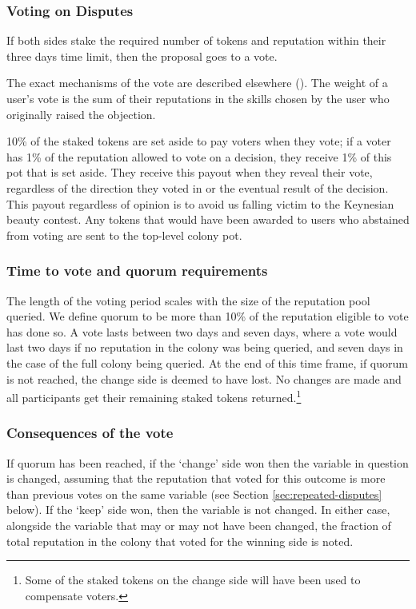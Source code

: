 \subsubsection{Voting on Disputes}
If both sides stake the required number of tokens and reputation within their three days time limit, then the proposal goes to a vote.

The exact mechanisms of the vote are described elsewhere (\cite{ColonyVoting}). The weight of a user's vote is the sum of their reputations in the skills chosen by the user who originally raised the objection.


10\% of the staked tokens are set aside to pay voters when they vote; if a voter has 1\% of the reputation allowed to vote on a decision, they receive 1\% of this pot that is set aside. They receive this payout when they reveal their vote, regardless of the direction they voted in or the eventual result of the decision. This payout regardless of opinion is to avoid us falling victim to the Keynesian beauty contest\cite{KeynesianBeauty}. Any tokens that would have been awarded to users who abstained from voting are sent to the top-level colony pot.


\subsubsection{Time to vote and quorum requirements}
The length of the voting period scales with the size of the reputation pool queried. We define quorum to be more than 10\% of the reputation eligible to vote has done so. A vote lasts between two days and seven days, where a vote would last two days if no reputation in the colony was being queried, and seven days in the case of the full colony being queried. At the end of this time frame, if quorum is not reached, the change side is deemed to have lost. No changes are made and all participants get their remaining staked tokens returned.\footnote{Some of the staked tokens on the change side will have been used to compensate voters.}

\subsubsection{Consequences of the vote}
If quorum has been reached, if the `change' side won then the variable in question is changed, assuming that the reputation that voted for this outcome is more than previous votes on the same variable (see Section \ref{sec:repeated-disputes} below). If the `keep' side won, then the variable is not changed. In either case, alongside the variable that may or may not have been changed, the fraction of total reputation in the colony that voted for the winning side is noted. 

